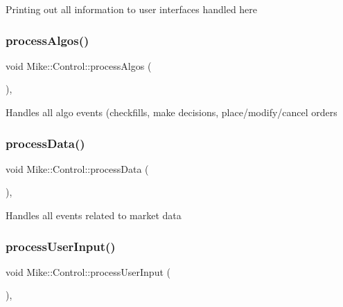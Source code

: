 Printing out all information to user interfaces handled here \mbox{\label{class_mike_1_1_control_acf3d41cb5dd54a2ee31cfb0709a79e7e}} 
\subsubsection{\texorpdfstring{process\+Algos()}{processAlgos()}}
{\footnotesize\ttfamily void Mike\+::\+Control\+::process\+Algos (\begin{DoxyParamCaption}{ }\end{DoxyParamCaption})\hspace{0.3cm}{\ttfamily [inline]}, {\ttfamily [private]}}

Handles all algo events (checkfills, make decisions, place/modify/cancel orders \mbox{\label{class_mike_1_1_control_a887652b2503a6e881fcceca36f0a0af9}} 
\subsubsection{\texorpdfstring{process\+Data()}{processData()}}
{\footnotesize\ttfamily void Mike\+::\+Control\+::process\+Data (\begin{DoxyParamCaption}{ }\end{DoxyParamCaption})\hspace{0.3cm}{\ttfamily [inline]}, {\ttfamily [private]}}

Handles all events related to market data \mbox{\label{class_mike_1_1_control_ad06eaf996f971a758eea1fd55eda2565}} 
\subsubsection{\texorpdfstring{process\+User\+Input()}{processUserInput()}}
{\footnotesize\ttfamily void Mike\+::\+Control\+::process\+User\+Input (\begin{DoxyParamCaption}{ }\end{DoxyParamCaption})\hspace{0.3cm}{\ttfamily [inline]}, {\ttfamily [private]}}

